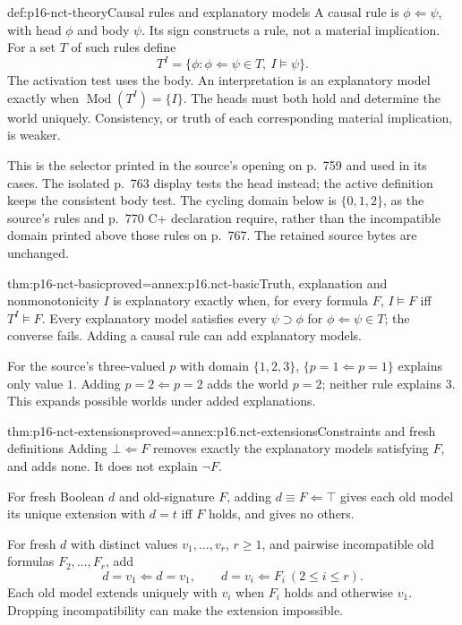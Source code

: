 \begin{hbdefinition}{def:p16-nct-theory}{Causal rules and explanatory models}
A causal rule is \(\phi\Leftarrow\psi\), with head \(\phi\) and body
\(\psi\). Its sign constructs a rule, not a material implication.
For a set \(T\) of such rules define
\[
 T^I=\{\phi:\phi\Leftarrow\psi\in T,\ I\models\psi\}.
\]
The activation test uses the body. An interpretation is an explanatory
model exactly when \(\operatorname{Mod}(T^I)=\{I\}\).
The heads must both hold and determine the world uniquely.
Consistency, or truth of each corresponding material implication, is weaker.
\end{hbdefinition}

This is the selector printed in the source's opening on p.~759 and used in
its cases. The isolated p.~763 display tests the head instead; the active
definition keeps the consistent body test. The cycling domain below is
\(\{0,1,2\}\), as the source's rules and p.~770 C+ declaration require,
rather than the incompatible domain printed above those rules on p.~767.
The retained source bytes are unchanged.

\begin{hbtheorem}{thm:p16-nct-basic}{proved=annex:p16.nct-basic}{Truth, explanation and nonmonotonicity}
\(I\) is explanatory exactly when, for every formula \(F\),
\(I\models F\) iff \(T^I\models F\).
Every explanatory model satisfies every \(\psi\supset\phi\) for
\(\phi\Leftarrow\psi\in T\); the converse fails.
Adding a causal rule can add explanatory models.
\end{hbtheorem}

For the source's three-valued \(p\) with domain \(\{1,2,3\}\),
\(\{p=1\Leftarrow p=1\}\) explains only value \(1\).
Adding \(p=2\Leftarrow p=2\) adds the world \(p=2\); neither rule
explains \(3\). This expands possible worlds under added explanations.

\begin{hbtheorem}{thm:p16-nct-extensions}{proved=annex:p16.nct-extensions}{Constraints and fresh definitions}
Adding \(\bot\Leftarrow F\) removes exactly the explanatory models satisfying
\(F\), and adds none. It does not explain \(\neg F\).

For fresh Boolean \(d\) and old-signature \(F\), adding
\(d\equiv F\Leftarrow\top\) gives each old model its unique extension
with \(d=t\) iff \(F\) holds, and gives no others.

For fresh \(d\) with distinct values \(v_1,\ldots,v_r\), \(r\geq1\),
and pairwise incompatible old formulas \(F_2,\ldots,F_r\), add
\[
 d=v_1\Leftarrow d=v_1,\qquad d=v_i\Leftarrow F_i\ (2\leq i\leq r).
\]
Each old model extends uniquely with \(v_i\) when \(F_i\) holds and
otherwise \(v_1\). Dropping incompatibility can make the extension impossible.
\end{hbtheorem}

